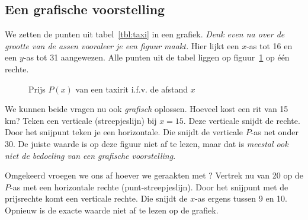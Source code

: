 \subsection{Een grafische voorstelling}
\label{subsec:grafischeVoorstelling}
We zetten de punten uit tabel~\ref{tbl:taxi} in een grafiek. \emph{Denk even na over de grootte van de assen vooraleer je een figuur maakt.} Hier lijkt een $x$-as tot 16 en een $y$-as tot 31 aangewezen. Alle punten uit de tabel liggen op figuur~\ref{fig:taxir} op één rechte.
\begin{figure}[htbp]
    \centering
{}
\caption{Prijs $P(x)$ van een taxirit i.f.v. de afstand $x$}
    \label{fig:taxir}
\end{figure}

We kunnen beide vragen nu ook \emph{grafisch} oplossen. Hoeveel kost een rit van 15 km? Teken een verticale (streepjeslijn) bij $x=15$. Deze verticale snijdt de rechte. Door het snijpunt teken je een horizontale. Die snijdt de verticale $P$-as net onder 30. De juiste waarde is op deze figuur niet af te lezen, maar dat is \emph{meestal ook niet de bedoeling van een grafische voorstelling}.

Omgekeerd vroegen we ons af hoever we geraakten met ? Vertrek nu van 20 op de $P$-as met een horizontale rechte (punt-streepjeslijn). Door het snijpunt met de prijsrechte komt een verticale rechte. Die snijdt de $x$-as ergens tussen 9 en 10. Opnieuw is de exacte waarde niet af te lezen op de grafiek.




